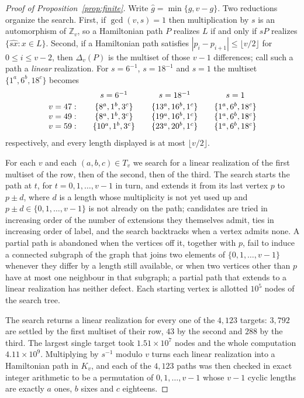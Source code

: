 \documentclass[11pt]{amsart}
\theoremstyle{remark}
\newcommand{\Z}{\mathbb Z}
\begin{document}
\begin{proof}[Proof of Proposition~\ref{prop:finite}]
Write $\widehat g=\min\{g,v-g\}$.  Two reductions organize the search.
First, if $\gcd(v,s)=1$ then multiplication by $s$ is an automorphism of
$\Z_v$, so a Hamiltonian path $P$ realizes $L$ if and only if $sP$ realizes
$\{\widehat{sx}:x\in L\}$.  Second, if a Hamiltonian path satisfies
$|p_i-p_{i+1}|\le\lfloor v/2\rfloor$ for $0\le i\le v-2$, then $\Delta_v(P)$
is the multiset of those $v-1$ differences; call such a path a \emph{linear}
realization.  For $s=6^{-1}$, $s=18^{-1}$ and $s=1$ the multiset
$\{1^a,6^b,18^c\}$ becomes
\[
  \begin{array}{r@{\qquad}c@{\qquad}c@{\qquad}c}
   & s=6^{-1} & s=18^{-1} & s=1\\[2pt]
   v=47: & \{8^a,1^b,3^c\} & \{13^a,16^b,1^c\} & \{1^a,6^b,18^c\}\\
   v=49: & \{8^a,1^b,3^c\} & \{19^a,16^b,1^c\} & \{1^a,6^b,18^c\}\\
   v=59: & \{10^a,1^b,3^c\} & \{23^a,20^b,1^c\} & \{1^a,6^b,18^c\}
  \end{array}
\]
respectively, and every length displayed is at most $\lfloor v/2\rfloor$.

For each $v$ and each $(a,b,c)\in T_v$ we search for a linear realization of
the first multiset of the row, then of the second, then of the third.  The
search starts the path at $t$, for $t=0,1,\ldots,v-1$ in turn, and extends it
from its last vertex $p$ to $p\pm d$, where $d$ is a length whose
multiplicity is not yet used up and $p\pm d\in\{0,1,\ldots,v-1\}$ is not
already on the path; candidates are tried in increasing order of the number
of extensions they themselves admit, ties in increasing order of label, and
the search backtracks when a vertex admits none.  A partial path is abandoned
when the vertices off it, together with $p$, fail to induce a connected
subgraph of the graph that joins two elements of $\{0,1,\ldots,v-1\}$
whenever they differ by a length still available, or when two vertices
other than $p$ have at most one neighbour in that subgraph; a partial path that
extends to a linear realization has neither defect.  Each starting vertex is
allotted $10^5$ nodes of the search tree.

The search returns a linear realization for every one of the $4{,}123$
targets: $3{,}792$ are settled by the first multiset of their row, $43$ by
the second and $288$ by the third.  The largest single target took
$1.51\times10^{7}$ nodes and the whole computation $4.11\times10^{9}$.
Multiplying by $s^{-1}$ modulo $v$ turns each linear realization into a
Hamiltonian path in $K_v$, and each of the $4{,}123$ paths was then checked
in exact integer arithmetic to be a permutation of $0,1,\ldots,v-1$ whose
$v-1$ cyclic lengths are exactly $a$ ones, $b$ sixes and $c$ eighteens.
\end{proof}
\end{document}
